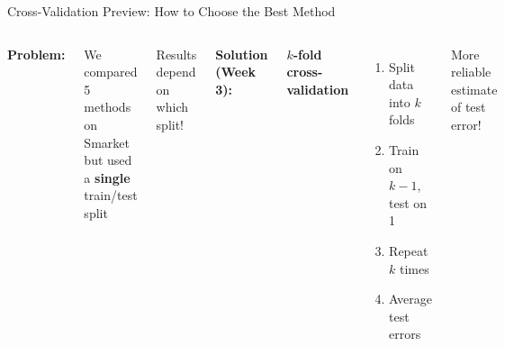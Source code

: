 \documentclass[aspectratio=169, 11pt]{beamer}
\begin{document}
\begin{frame}{Cross-Validation Preview: How to Choose the Best Method}

\begin{columns}
\textbf{Problem:}

We compared 5 methods on Smarket\\
but used a \textbf{single} train/test split

\vspace{0.3em}
Results depend on which split!

\vspace{0.5em}
\textbf{Solution (Week 3):}

\textbf{$k$-fold cross-validation}

\begin{enumerate}
  \item Split data into $k$ folds
  \item Train on $k-1$, test on 1
  \item Repeat $k$ times
  \item Average test errors
\end{enumerate}


\vspace{0.3em}
More reliable estimate of test error!
\end{columns}
\end{frame}
\end{document}
